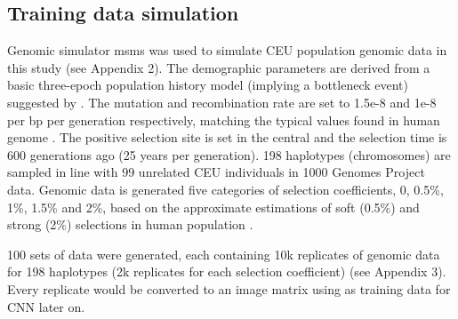 \documentclass[a4paper,12pt,oneside]{extarticle}
\begin{document}
\subsection{Training data simulation }
Genomic simulator msms \cite{31} was used to simulate CEU population genomic data in this study (see Appendix 2). The demographic parameters are derived from a basic three-epoch population history model (implying a bottleneck event) suggested by \cite{32}. The mutation and recombination rate are set to 1.5e-8 and 1e-8 per bp per generation respectively, matching the typical values found in human genome \cite{33,34}. The positive selection site is set in the central and the selection time is 600 generations ago (25 years per generation). 198 haplotypes (chromosomes) are sampled in line with 99 unrelated CEU individuals in 1000 Genomes Project data. Genomic data is generated five categories of selection coefficients, 0, 0.5\%, 1\%, 1.5\% and 2\%, based on the approximate estimations of soft (0.5\%) and strong (2\%) selections in human population \cite{35,36}.
\par
100 sets of data were generated, each containing 10k replicates of genomic data for 198 haplotypes (2k replicates for each selection coefficient) (see Appendix 3). Every replicate would be converted to an image matrix using as training data for CNN later on.
\end{document}
